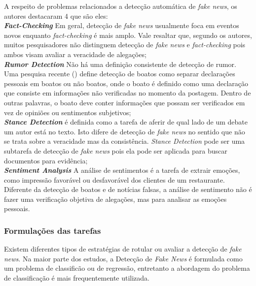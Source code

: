 A respeito de problemas relacionados a detecção automática de \textit{fake news}, os autores destacaram 4 que são eles: \\

\textbf{\textit{Fact-Checking}} Em geral, detecção de \textit{fake news} usualmente foca em eventos novos enquanto \textit{fact-checking} é mais amplo. Vale resaltar que, segundo os autores, muitos pesquisadores não distinguem detecção de \textit{fake news} e \textit{fact-checking} pois ambos visam avaliar a veracidade de alegações;  \\

\textbf{\textit{Rumor Detection}} Não há uma definição consistente de detecção de rumor. Uma pesquisa recente (\cite{zubiaga2018}) define detecção de boatos como separar declarações pessoais em boatos ou não boatos, onde o boato é definido como uma declaração que consiste em informações não verificadas no momento da postagem. Dentro de outras palavras, o boato deve conter informações que possam ser verificados em vez de opiniões ou sentimentos subjetivos; \\


\textbf{\textit{Stance Detection}} é definida como a tarefa de aferir de qual lado de um debate um autor está no texto. Isto difere de detecção de \textit{fake news} no sentido que não se trata sobre a veracidade mas da consistência. \textit{Stance Detection} pode ser uma subtarefa de detecção de \textit{fake news} pois ela pode ser aplicada para buscar documentos para evidência; \\


\textbf{\textit{Sentiment Analysis}} A análise de sentimentos é a tarefa de extrair emoções, como impressão favorável ou desfavorável dos clientes de um restaurante. Diferente da detecção de boatos e de notícias falsas, a análise de sentimento não é fazer uma verificação objetiva de alegações, mas para analisar as emoções pessoais. \\


\subsubsection{Formulações das tarefas}

Existem diferentes tipos de estratégias de rotular ou avaliar a detecção de \textit{fake news}. Na maior parte dos estudos, a Detecção de \textit{Fake News} é formulada como um problema de classificão ou de regressão, entretanto a abordagem do problema de classificação é mais frequentemente utilizada. \\

